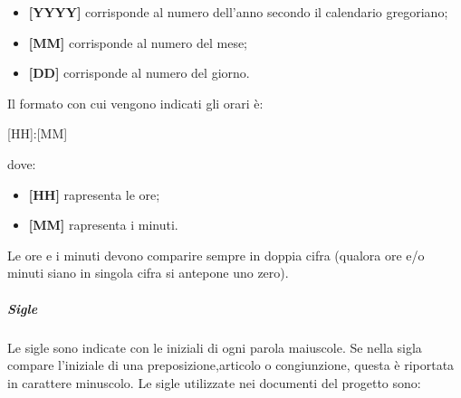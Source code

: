     \begin{itemize}
        \item \textbf{[YYYY]} corrisponde al numero dell'anno secondo il calendario gregoriano;
        \item \textbf{[MM]} corrisponde al numero del mese;
        \item \textbf{[DD]} corrisponde al numero del giorno.
    \end{itemize}
Il formato con cui vengono indicati gli orari è:
\begin{center}
    [HH]:[MM]
\end{center} 
dove:
\begin{itemize}
    \item \textbf{[HH]} rapresenta le ore;
    \item \textbf{[MM]} rapresenta i minuti.
\end{itemize}
Le ore e i minuti devono comparire sempre in doppia cifra (qualora ore e/o minuti siano in singola cifra si antepone uno zero). 
\subparagraph{Sigle}
Le sigle sono indicate con le iniziali di ogni parola maiuscole. Se nella sigla compare l'iniziale di una preposizione,articolo o congiunzione, questa è riportata in carattere minuscolo.
Le sigle utilizzate nei documenti del progetto sono:

